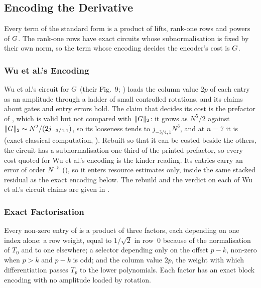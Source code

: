 \subsection{Encoding the Derivative}
\label{sec:standard-factorisation}

Every term of the standard form is a product of lifts, rank-one rows and powers of $G$. The rank-one rows have exact circuits whose subnormalisation is fixed by their own norm, so the term whose encoding decides the encoder's cost is $G$.

\subsubsection{Wu et al.'s Encoding}
\label{sec:standard-published}

Wu et al.'s circuit for $G$ (their Fig.~9; ) loads the column value $2p$ of each entry as an amplitude through a ladder of small controlled rotations, and its claims about gates and entry errors hold. The claim that decides its cost is the prefactor of , which is valid but not compared with $\|G\|_2$: it grows as $N^5/2$ against $\|G\|_2\sim N^2/(2j_{-3/4,1})$, so its looseness tends to $j_{-3/4,1}N^3$, and at $n=7$ it is  (exact classical computation, ). Rebuilt so that it can be costed beside the others, the circuit has a subnormalisation one third of the printed prefactor, so every cost quoted for Wu et al.'s encoding is the kinder reading. Its entries carry an error of order $N^{-5}$ (), so it enters resource estimates only, inside the same stacked residual as the exact encoding below. The rebuild and the verdict on each of Wu et al.'s circuit claims are given in .

\subsubsection{Exact Factorisation}
\label{sec:standard-exact}

Every non-zero entry of  is a product of three factors, each depending on one index alone: a row weight, equal to $1/\sqrt2$ in row~0 because of the normalisation of $T_0$ and to one elsewhere; a selector depending only on the offset $p-k$, non-zero when $p>k$ and $p-k$ is odd; and the column value $2p$, the weight with which differentiation passes $T_p$ to the lower polynomials. Each factor has an exact block encoding with no amplitude loaded by rotation.

